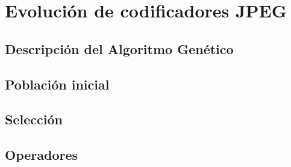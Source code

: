 
\chapter{Evolución de codificadores JPEG}\label{ch:resultados_evolucion}

\section{Descripción del Algoritmo Genético}

\section{Población inicial}

\section{Selección}

\section{Operadores}

